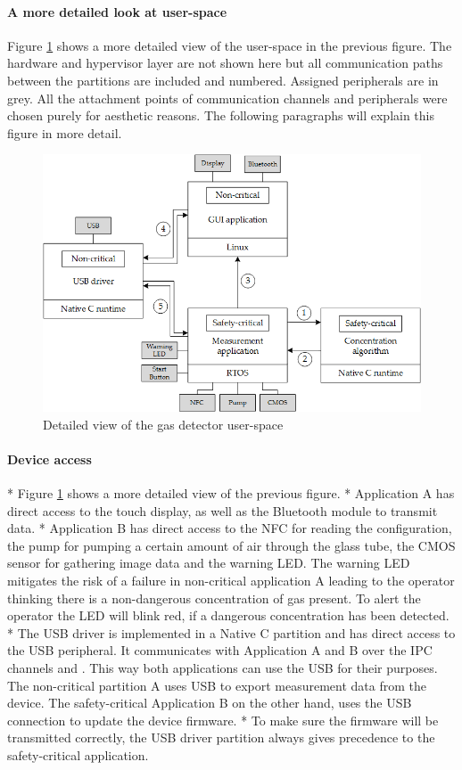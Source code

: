 \paragraph{A more detailed look at user-space}
Figure \ref{fig:gas_detect_low_leve} shows a more detailed view of the user-space in the previous figure. The hardware and hypervisor layer are not shown here but all communication paths between the partitions are included and numbered. Assigned peripherals are in grey. All the attachment points of communication channels and peripherals were chosen purely for aesthetic reasons. The following paragraphs will explain this figure in more detail.

\begin{figure}[ht!]
\centering
\includegraphics[scale=0.75]{Figures/gas_detect_low_level.png}
\decoRule
\caption{Detailed view of the gas detector user-space}
\label{fig:gas_detect_low_leve}
\end{figure}
\paragraph{Device access}
* Figure \ref{fig:gas_detect_low_leve} shows a more detailed view of the previous figure.
* Application A has direct access to the touch display, as well as the Bluetooth module to transmit data.
* Application B has direct access to the NFC for reading the configuration, the pump for pumping a certain amount of air through the glass tube, the CMOS sensor for gathering image data and the warning LED. The warning LED mitigates the risk of a failure in non-critical application A leading to the operator thinking there is a non-dangerous concentration of gas present. To alert the operator the LED will blink red, if a dangerous concentration has been detected.
* The USB driver is implemented in a Native C partition and has direct access to the USB peripheral. It communicates with Application A and B over the IPC channels \aTousb{} and \bTousb{}. This way both applications can use the USB for their purposes. The non-critical partition A uses USB to export measurement data from the device. The safety-critical Application B on the other hand, uses the USB connection to update the device firmware. 
* To make sure the firmware will be transmitted correctly, the USB driver partition always gives precedence to the safety-critical application.
